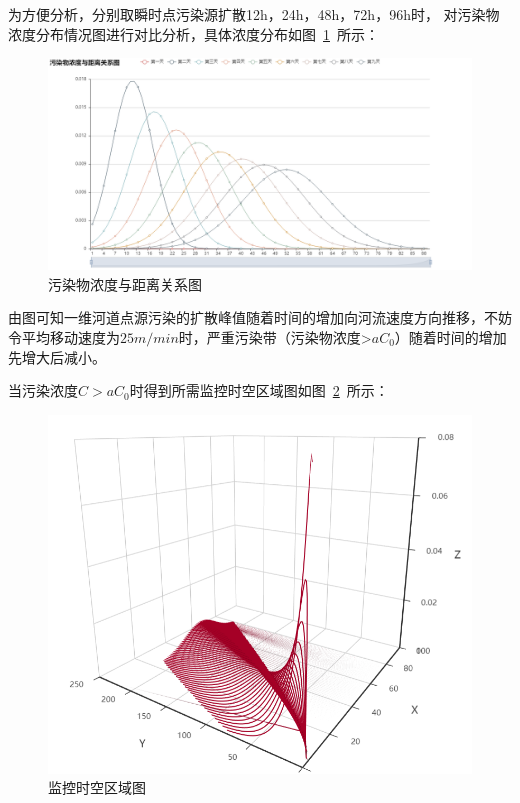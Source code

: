 \documentclass{whutmod}
\begin{document}
	为方便分析，分别取瞬时点污染源扩散12h，24h，48h，72h，96h时，
	对污染物浓度分布情况图进行对比分析，具体浓度分布如图~\ref{wrw}~所示：
		\begin{figure}[H]
	\centering
	\includegraphics[width=\textwidth]{figures/wrw.png}
	\caption{污染物浓度与距离关系图}\label{wrw}
	\end{figure}

	由图可知一维河道点源污染的扩散峰值随着时间的增加向河流速度方向推移，不妨令平均移动速度为$25m/min$时，严重污染带（污染物浓度>$
	aC_{0}$）随着时间的增加先增大后减小。     
	
	当污染浓度$C>aC_{0}$时得到所需监控时空区域图如图~\ref{ndfb}~所示：
		\begin{figure}[H]
	\centering
	\includegraphics[width=\textwidth]{figures/ndfb.png}
	\caption{监控时空区域图}\label{ndfb}
\end{figure}
	
\end{document}
